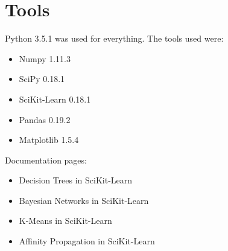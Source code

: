 \section{Tools}

Python 3.5.1 was used for everything. The tools used were:

\begin{itemize}
    \item Numpy 1.11.3~\cite{web_numpy}
    \item SciPy 0.18.1~\cite{web_scipy}
    \item SciKit-Learn 0.18.1~\cite{web_scikit}
    \item Pandas 0.19.2~\cite{web_pandas}
    \item Matplotlib 1.5.4~\cite{web_matplotlib}
\end{itemize}

Documentation pages:

\begin{itemize}
    \item Decision Trees in SciKit-Learn~\cite{web_scikit_trees}
    \item Bayesian Networks in SciKit-Learn~\cite{web_scikit_bayes}
    \item K-Means in SciKit-Learn~\cite{web_scikit_kmeans}
    \item Affinity Propagation in SciKit-Learn~\cite{web_scikit_affinity}
\end{itemize}

